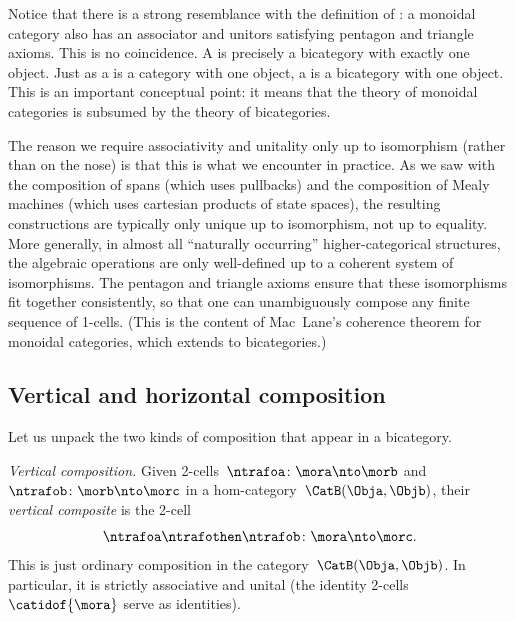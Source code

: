\begin{remark}
    Notice that there is a strong resemblance with the definition of : a monoidal category also has an associator and unitors satisfying pentagon and triangle axioms.
    This is no coincidence.
    A  is precisely a bicategory with exactly one object.
    Just as a  is a category with one object, a  is a bicategory with one object.
    This is an important conceptual point: it means that the theory of monoidal categories is subsumed by the theory of bicategories.
\end{remark}

\begin{remark}
    \label{rem:bicat-why-weak}
    The reason we require associativity and unitality only up to isomorphism (rather than on the nose) is that this is what we encounter in practice.
    As we saw with the composition of spans (which uses pullbacks) and the composition of Mealy machines (which uses cartesian products of state spaces), the resulting constructions are typically only unique up to isomorphism, not up to equality.
    More generally, in almost all ``naturally occurring'' higher-categorical structures, the algebraic operations are only well-defined up to a coherent system of isomorphisms.
    The pentagon and triangle axioms ensure that these isomorphisms fit together consistently, so that one can unambiguously compose any finite sequence of 1-cells.
    (This is the content of Mac~Lane's coherence theorem for monoidal categories, which extends to bicategories.)
\end{remark}

\subsection{Vertical and horizontal composition}
\label{sec:bicat-compositions}

Let us unpack the two kinds of composition that appear in a bicategory.

\emph{Vertical composition.}
Given 2-cells~$\ntrafoa \colon \mora \nto \morb$ and~$\ntrafob \colon \morb \nto \morc$ in a hom-category~$\CatB(\Obja, \Objb)$, their \emph{vertical composite} is the 2-cell
\begin{equation}
    \ntrafoa \ntrafothen \ntrafob \colon \mora \nto \morc.
\end{equation}
This is just ordinary composition in the category~$\CatB(\Obja, \Objb)$.
In particular, it is strictly associative and unital (the identity 2-cells~$\catidof{\mora}$ serve as identities).

